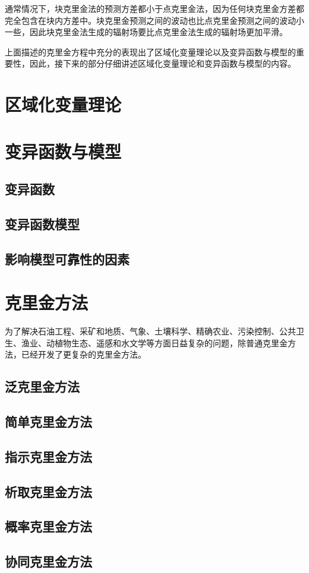 通常情况下，块克里金法的预测方差都小于点克里金法，因为任何块克里金方差都完全包含在块内方差中。块克里金预测之间的波动也比点克里金预测之间的波动小一些，因此块克里金法生成的辐射场要比点克里金法生成的辐射场更加平滑。

上面描述的克里金方程中充分的表现出了区域化变量理论以及变异函数与模型的重要性，因此，接下来的部分仔细讲述区域化变量理论和变异函数与模型的内容。

\section{区域化变量理论}


\section{变异函数与模型}

\subsection{变异函数}

\subsection{变异函数模型}

\subsection{影响模型可靠性的因素}

\section{克里金方法}
为了解决石油工程、采矿和地质、气象、土壤科学、精确农业、污染控制、公共卫生、渔业、动植物生态、遥感和水文学等方面日益复杂的问题，除普通克里金方法，已经开发了更复杂的克里金方法。
\subsection{泛克里金方法}

\subsection{简单克里金方法}

\subsection{指示克里金方法}

\subsection{析取克里金方法}

\subsection{概率克里金方法}

\subsection{协同克里金方法}